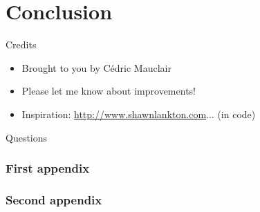 \section
  {Conclusion}

\begin{bibunit}[plain]
\begin{frame}
  {Credits}

  \begin{itemize}
  \item Brought to you by Cédric Mauclair
  \item Please let me know about improvements!
  \item Inspiration: \url{http://www.shawnlankton.com}... (in code)
  \end{itemize}

  \nocite{ipsum}
  

\end{frame}
\end{bibunit}

\begin{bibunit}[plain]
\begin{frame}
  {Questions}

  \nocite{lorem}
  

\end{frame}
\end{bibunit}


\appendix[Appendices]

\begin{frame}
  \frametitle{First appendix}
\end{frame}

\begin{frame}
  \frametitle{Second appendix}
\end{frame}




